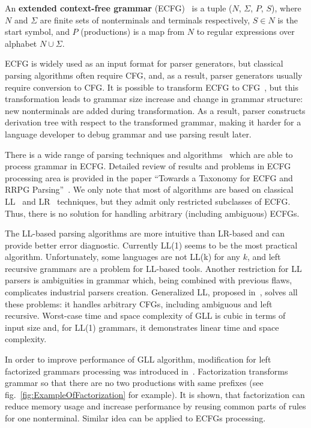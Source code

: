\documentclass[runningheads,a4paper]{llncs}
\begin{document}
\begin{mydef}
An \textbf{extended context-free grammar} (ECFG)~\cite{ECFG} is a tuple ($N$, $\Sigma$, $P$, $S$), where $N$
and $\Sigma$ are finite sets of nonterminals and terminals respectively, $ S\in N$ is the start symbol,
and $P$ (productions) is a map from $N$ to regular expressions over alphabet $N \cup \Sigma$.
\end{mydef}

ECFG is widely used as an input format for parser generators, but classical parsing algorithms often require CFG, and, as a result, parser generators usually require conversion to CFG.
It is possible to transform ECFG to CFG~\cite{ELL}, but this transformation leads to grammar size 
increase and change in grammar structure: new nonterminals are added during transformation.
As a result, parser constructs derivation tree with respect to the transformed grammar, making it harder for a language developer to debug grammar and use parsing result later.

There is a wide range of parsing techniques and algorithms~\cite{AttributedELL,ELRR,ECFGparsing,ELLParser,ELL,ECFG,ELALR,ELRParsing} which are able to process grammar in ECFG.
Detailed review of results and problems in ECFG processing area is provided in the paper ``Towards a Taxonomy for ECFG and RRPG Parsing''~\cite{ECFG}. 
We only note that most of algorithms are based on classical LL~\cite{ELLParser,AttributedELL,PredictiveECFG} and
LR~\cite{ELRParsing,ELALR,ELRR} techniques, but they admit only restricted subclasses of ECFG.
Thus, there is no solution for handling arbitrary (including ambiguous) ECFGs.

The LL-based parsing algorithms are more intuitive than LR-based and can provide better error diagnostic.
Currently LL(1) seems to be the most practical algorithm.
Unfortunately, some languages are not LL(k) for any $k$, and left recursive grammars are a problem for LL-based tools.
Another restriction for LL parsers is ambiguities in grammar which, being combined with previous flaws, complicates industrial parsers creation.
Generalized LL, proposed in~\cite{scott2010gll}, solves all these problems: it handles arbitrary CFGs, including ambiguous and left recursive.  
Worst-case time and space complexity of GLL is cubic in terms of input size and, for LL(1) grammars, it demonstrates linear time and space complexity.

In order to improve performance of GLL algorithm, modification for left factorized grammars processing was introduced in~\cite{scott2016structuring}.
Factorization transforms grammar so that there are no two productions with same prefixes (see fig.~\ref{fig:ExampleOfFactorization} for example).
It is shown, that factorization can reduce memory usage and increase performance by reusing common parts of rules for one nonterminal.
Similar idea can be applied to ECFGs processing.
\end{document}
